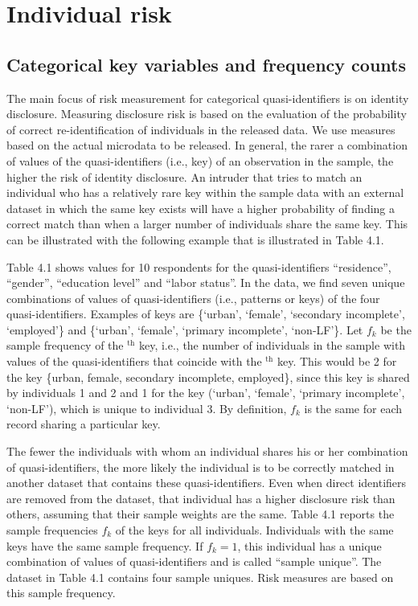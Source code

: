 \documentclass[letterpaper,10pt,english]{sphinxmanual}
\begin{document}
\section{Individual risk}
\label{\detokenize{measure_risk:individual-risk}}

\subsection{Categorical key variables and frequency counts}
\label{\detokenize{measure_risk:categorical-key-variables-and-frequency-counts}}
The main focus of risk measurement for categorical quasi-identifiers is
on identity disclosure. Measuring disclosure risk is based on the
evaluation of the probability of correct re-identification of
individuals in the released data. We use measures based on the actual
microdata to be released. In general, the rarer a combination of values
of the quasi-identifiers (i.e., key) of an observation in the sample,
the higher the risk of identity disclosure. An intruder that tries to
match an individual who has a relatively rare key within the sample data
with an external dataset in which the same key exists will have a higher
probability of finding a correct match than when a larger number of
individuals share the same key. This can be illustrated with the
following example that is illustrated in Table 4.1.

Table 4.1 shows values for 10 respondents for the quasi-identifiers
“residence”, “gender”, “education level” and “labor status”. In the
data, we find seven unique combinations of values of quasi-identifiers
(i.e., patterns or keys) of the four quasi-identifiers. Examples of keys
are \{‘urban’, ‘female’, ‘secondary incomplete’, ‘employed’\} and
\{‘urban’, ‘female’, ‘primary incomplete’, ‘non-LF’\}. Let \(f_{k}\)
be the sample frequency of the $^{\text{th}}$ key, i.e., the number of
individuals in the sample with values of the quasi-identifiers that
coincide with the $^{\text{th}}$ key. This would be 2 for the key
\{urban, female, secondary incomplete, employed\}, since this key is
shared by individuals 1 and 2 and 1 for the key (‘urban’, ‘female’,
‘primary incomplete’, ‘non-LF’), which is unique to individual 3. By
definition, \(f_{k}\) is the same for each record sharing a
particular key.

The fewer the individuals with whom an individual shares his or her
combination of quasi-identifiers, the more likely the individual is to
be correctly matched in another dataset that contains these
quasi-identifiers. Even when direct identifiers are removed from the
dataset, that individual has a higher disclosure risk than others,
assuming that their sample weights are the same. Table 4.1 reports the
sample frequencies \(f_{k}\) of the keys for all individuals.
Individuals with the same keys have the same sample frequency. If
\(f_{k} = 1\), this individual has a unique combination of values of
quasi-identifiers and is called “sample unique”. The dataset in Table
4.1 contains four sample uniques. Risk measures are based on this sample
frequency.
\end{document}
